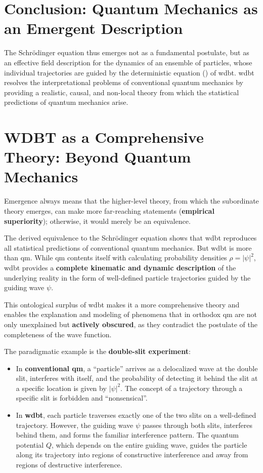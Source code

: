 \section{Conclusion: Quantum Mechanics as an Emergent Description}
The Schrödinger equation thus emerges not as a fundamental postulate, but as an effective field description for the dynamics of an ensemble of particles, whose individual trajectories are guided by the deterministic equation () of \gls{wdbt}. \gls{wdbt} resolves the interpretational problems of conventional quantum mechanics by providing a realistic, causal, and non-local theory from which the statistical predictions of quantum mechanics arise.

\section{WDBT as a Comprehensive Theory: Beyond Quantum Mechanics}
Emergence always means that the higher-level theory, from which the subordinate theory emerges, can make more far-reaching statements (\textbf{empirical superiority}); otherwise, it would merely be an equivalence.

The derived equivalence to the Schrödinger equation shows that \gls{wdbt} reproduces all statistical predictions of conventional quantum mechanics. But \gls{wdbt} is more than \gls{qm}. While \gls{qm} contents itself with calculating probability densities $\rho = \left| \psi \right|^2$, \gls{wdbt} provides a \textbf{complete kinematic and dynamic description} of the underlying reality in the form of well-defined particle trajectories guided by the guiding wave $\psi$.

This ontological surplus of \gls{wdbt} makes it a more comprehensive theory and enables the explanation and modeling of phenomena that in orthodox \gls{qm} are not only unexplained but \textbf{actively obscured}, as they contradict the postulate of the completeness of the wave function.

The paradigmatic example is the \textbf{double-slit experiment}:

\begin{itemize}
    \item In \textbf{conventional \gls{qm}}, a \enquote{particle} arrives as a delocalized wave at the double slit, interferes with itself, and the probability of detecting it behind the slit at a specific location is given by $\left| \psi \right|^2$. The concept of a trajectory through a specific slit is forbidden and \enquote{nonsensical}.
    \item In \textbf{\gls{wdbt}}, each particle traverses exactly one of the two slits on a well-defined trajectory. However, the guiding wave $\psi$ passes through both slits, interferes behind them, and forms the familiar interference pattern. The quantum potential $Q$, which depends on the entire guiding wave, guides the particle along its trajectory into regions of constructive interference and away from regions of destructive interference.
\end{itemize}


